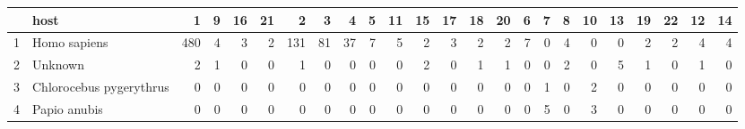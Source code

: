 \begin{table}[ht]
\centering
\begin{tabular}{llrrrrrrrrrrrrrrrrrrrrrr}
  \hline
 & host & 1 & 9 & 16 & 21 & 2 & 3 & 4 & 5 & 11 & 15 & 17 & 18 & 20 & 6 & 7 & 8 & 10 & 13 & 19 & 22 & 12 & 14 \\ 
  \hline
1 & Homo sapiens & 480 & 4 & 3 & 2 & 131 & 81 & 37 & 7 & 5 & 2 & 3 & 2 & 2 & 7 & 0 & 4 & 0 & 0 & 2 & 2 & 4 & 4 \\ 
  2 & Unknown & 2 & 1 & 0 & 0 & 1 & 0 & 0 & 0 & 0 & 2 & 0 & 1 & 1 & 0 & 0 & 2 & 0 & 5 & 1 & 0 & 1 & 0 \\ 
  3 & Chlorocebus pygerythrus & 0 & 0 & 0 & 0 & 0 & 0 & 0 & 0 & 0 & 0 & 0 & 0 & 0 & 0 & 1 & 0 & 2 & 0 & 0 & 0 & 0 & 0 \\ 
  4 & Papio anubis & 0 & 0 & 0 & 0 & 0 & 0 & 0 & 0 & 0 & 0 & 0 & 0 & 0 & 0 & 5 & 0 & 3 & 0 & 0 & 0 & 0 & 0 \\ 
   \hline
\end{tabular}
\end{table}
